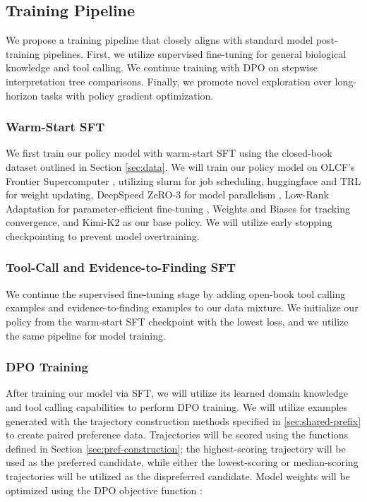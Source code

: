 \documentclass[thesis,letterpaper,12pt]{utthesis}
\begin{document}
\subsection{Training Pipeline}\label{sec:training}
We propose a training pipeline that closely aligns with standard model post-training pipelines. First, we utilize supervised fine-tuning for general biological knowledge and tool calling. We continue training with DPO on stepwise interpretation tree comparisons. Finally, we promote novel exploration over long-horizon tasks with policy gradient optimization.

\subsubsection{Warm-Start SFT}\label{sec:warmstart}
We first train our policy model with warm-start SFT using the closed-book dataset outlined in Section \ref{sec:data}. We will train our policy model on OLCF's Frontier Supercomputer \cite{frontier}, utilizing slurm \cite{slurm} for job scheduling, huggingface and TRL \cite{trl} for weight updating, DeepSpeed ZeRO-3 for model parallelism \cite{deepspeed}, Low-Rank Adaptation for parameter-efficient fine-tuning \cite{hu2022lora}, Weights and Biases \cite{wandb} for tracking convergence, and Kimi-K2 \cite{kimik2} as our base policy. We will utilize early stopping checkpointing to prevent model overtraining.

\subsubsection{Tool-Call and Evidence-to-Finding SFT}
We continue the supervised fine-tuning stage by adding open-book tool calling examples and evidence-to-finding examples to our data mixture. We initialize our policy from the warm-start SFT checkpoint with the lowest loss, and we utilize the same pipeline for model training.

\subsubsection{DPO Training}
After training our model via SFT, we will utilize its learned domain knowledge and tool calling capabilities to perform DPO training. We will utilize examples generated with the trajectory construction methods specified in \ref{sec:shared-prefix} to create paired preference data. Trajectories will be scored using the functions defined in Section \ref{sec:pref-construction}; the highest-scoring trajectory will be used as the preferred candidate, while either the lowest-scoring or median-scoring trajectories will be utilized as the dispreferred candidate. Model weights will be optimized using the DPO objective function \cite{dpo}:
\end{document}
